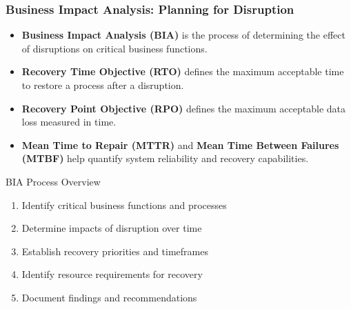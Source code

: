 \documentclass{beamer}
\begin{document}
            \begin{frame}
            \frametitle{Business Impact Analysis: Planning for Disruption}
            \begin{itemize}
              \item \textbf{Business Impact Analysis (BIA)} is the process of determining the effect of disruptions on critical business functions.
              \item \textbf{Recovery Time Objective (RTO)} defines the maximum acceptable time to restore a process after a disruption.
              \item \textbf{Recovery Point Objective (RPO)} defines the maximum acceptable data loss measured in time.
              \item \textbf{Mean Time to Repair (MTTR)} and \textbf{Mean Time Between Failures (MTBF)} help quantify system reliability and recovery capabilities.
            \end{itemize}
            
            \begin{exampleblock}{BIA Process Overview}
            \begin{enumerate}
              \item Identify critical business functions and processes
              \item Determine impacts of disruption over time
              \item Establish recovery priorities and timeframes
              \item Identify resource requirements for recovery
              \item Document findings and recommendations
            \end{enumerate}
            \end{exampleblock}
            \end{frame}
\end{document}
